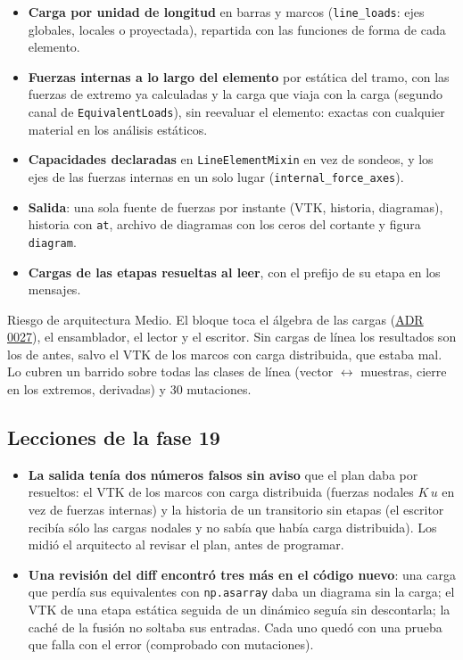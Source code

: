 \documentclass[11pt,oneside]{report}
\begin{document}
\begin{itemize}
  \item \textbf{Carga por unidad de longitud} en barras y marcos (\texttt{line\_loads}: ejes globales, locales o proyectada), repartida con las funciones de forma de cada elemento.
  \item \textbf{Fuerzas internas a lo largo del elemento} por estática del tramo, con las fuerzas de extremo ya calculadas y la carga que viaja con la carga (segundo canal de \texttt{EquivalentLoads}), sin reevaluar el elemento: exactas con cualquier material en los análisis estáticos.
  \item \textbf{Capacidades declaradas} en \texttt{LineElementMixin} en vez de sondeos, y los ejes de las fuerzas internas en un solo lugar (\texttt{internal\_\allowbreak{}force\_\allowbreak{}axes}).
  \item \textbf{Salida}: una sola fuente de fuerzas por instante (VTK, historia, diagramas), historia con \texttt{at}, archivo de diagramas con los ceros del cortante y figura \texttt{diagram}.
  \item \textbf{Cargas de las etapas resueltas al leer}, con el prefijo de su etapa en los mensajes.
\end{itemize}

\begin{infobox}{Riesgo de arquitectura}
Medio. El bloque toca el álgebra de las cargas (\hyperref[adr:0027]{ADR 0027}), el ensamblador, el lector y el escritor. Sin cargas de línea los resultados son los de antes, salvo el VTK de los marcos con carga distribuida, que estaba mal. Lo cubren un barrido sobre todas las clases de línea (vector \ensuremath{\leftrightarrow} muestras, cierre en los extremos, derivadas) y 30 mutaciones.
\end{infobox}

\subsection{Lecciones de la fase 19}

\begin{itemize}
  \item \textbf{La salida tenía dos números falsos sin aviso} que el plan daba por resueltos: el VTK de los marcos con carga distribuida (fuerzas nodales $K\,u$ en vez de fuerzas internas) y la historia de un transitorio sin etapas (el escritor recibía sólo las cargas nodales y no sabía que había carga distribuida). Los midió el arquitecto al revisar el plan, antes de programar.
  \item \textbf{Una revisión del diff encontró tres más en el código nuevo}: una carga que perdía sus equivalentes con \texttt{np.asarray} daba un diagrama sin la carga; el VTK de una etapa estática seguida de un dinámico seguía sin descontarla; la caché de la fusión no soltaba sus entradas. Cada uno quedó con una prueba que falla con el error (comprobado con mutaciones).
\end{itemize}
\end{document}
